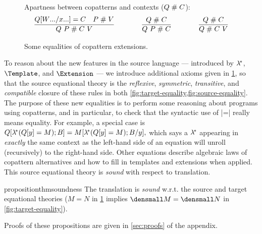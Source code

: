 \begin{figure}[t!]
Apartness between copatterns and contexts ($Q \apart C$):
\begin{gather*}
  \infer
  {Q ~ P \apart C ~ V}
  {Q\subst{\many{x}}{\many{W}} = C & P \apart V}
  \qqqquad
  \infer
  {Q ~ P \apart C}
  {Q \apart C}
  \qqqquad
  \infer
  {Q \apart C ~ V}
  {Q \apart C}
\end{gather*}

\caption{Some equalities of copattern extensions.}
\label{fig:source-equality}
\end{figure}

To reason about the new features in the source language --- introduced by $\lamstar$, $\Template$, and $\Extension$ --- we introduce additional axioms given in \cref{fig:source-equality}, so that the source equational theory is the \emph{reflexive}, \emph{symmetric}, \textit{transitive}, and \emph{compatible} closure of these rules in both \cref{fig:target-equality,fig:source-equality}.
The purpose of these new equalities is to perform some reasoning about programs using copatterns, and in particular, to check that the syntactic use of \scm|=| really means equality.
For example, a special case is
\begin{math}
  Q[\lamstar(Q[y] = M); B] = M\subst{y}{\lamstar(Q[y]=M);B}
  ,
\end{math}
which says a $\lamstar$ appearing in \emph{exactly} the same context as the left-hand side of an equation will unroll (recursively) to the right-hand side.
Other equations describe algebraic laws of copattern alternatives and how to fill in templates and extensions when applied.
This source equational theory is \emph{sound} with respect to translation.

\begin{restatable}[Soundness]{proposition}{thmsoundness}
  \label{thm:soundness}
  The translation is \emph{sound} w.r.t. the source and target equational theories (\eg $M = N$ in \cref{fig:source-equality} implies $\den{M} = \den{N}$ in \cref{fig:target-equality}).
\end{restatable}

Proofs of these propositions are given in \cref{sec:proofs} of the appendix.


